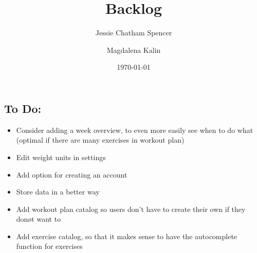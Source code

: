 \documentclass{article}
\title{Backlog}
\author{Jessie Chatham Spencer \and Magdalena Kalin}
\date{\today}
\begin{document}
\maketitle
\subsection*{To Do:}
\begin{itemize}
\item Consider adding a week overview, to even more easily see when to do what (optimal if there are many exercises in workout plan)
\item Edit weight units in settings
\item Add option for creating an account
\item Store data in a better way
\item Add workout plan catalog so users don't have to create their own if they donøt want to
\item Add exercise catalog, so that it makes sense to have the autocomplete function for exercises
\end{itemize}
\end{document}
